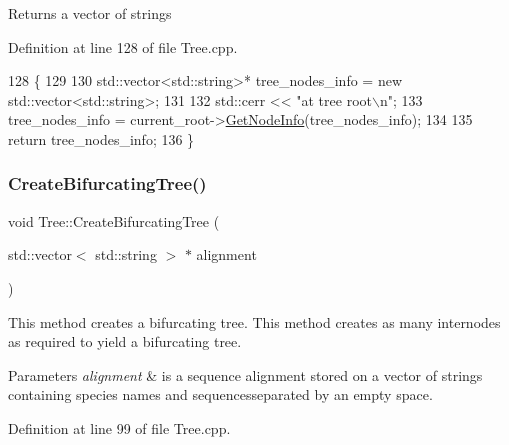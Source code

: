 \begin{DoxyReturn}{Returns}
a vector of strings 
\end{DoxyReturn}


Definition at line 128 of file Tree.\+cpp.


\begin{DoxyCode}
128                                                            \{
129   
130   std::vector<std::string>* tree\_nodes\_info = \textcolor{keyword}{new} std::vector<std::string>;
131   
132   std::cerr << \textcolor{stringliteral}{"at tree root\(\backslash\)n"};
133   tree\_nodes\_info = current\_root->\hyperlink{classNode_aeb57ef43b22fa37c2855ebb07e4e7331}{GetNodeInfo}(tree\_nodes\_info);
134   
135   \textcolor{keywordflow}{return} tree\_nodes\_info;
136 \}
\end{DoxyCode}
\mbox{\label{classTree_ac456dedd5e42bb0fea807aeb526e5a93}} 
\subsubsection{\texorpdfstring{Create\+Bifurcating\+Tree()}{CreateBifurcatingTree()}}
{\footnotesize\ttfamily void Tree\+::\+Create\+Bifurcating\+Tree (\begin{DoxyParamCaption}\item[{std\+::vector$<$ std\+::string $>$ $\ast$}]{alignment }\end{DoxyParamCaption})}

This method creates a bifurcating tree. This method creates as many internodes as required to yield a bifurcating tree.


\begin{DoxyParams}{Parameters}
{\em alignment} & is a sequence alignment stored on a vector of strings containing species names and sequencesseparated by an empty space. \\
\hline
\end{DoxyParams}


Definition at line 99 of file Tree.\+cpp.


